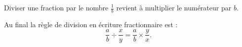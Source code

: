 

\begin{Aretenir}
    Diviser une fraction par le nombre \( \frac{1}{ b }\) revient à multiplier le numérateur par \( b\).
\end{Aretenir}

\begin{Aretenir}
    Au final la règle de division en écriture fractionnaire est :
    \begin{equation}
        \frac{ a }{ b }\div \frac{ x }{ y }=\frac{ a }{ b }\times \frac{ y }{ x }.
    \end{equation}
\end{Aretenir}
